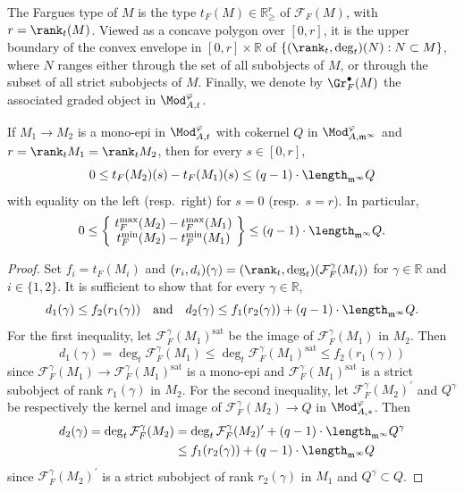 The Fargues type of $M$ is the type $t_{F}(M)\in\mathbb{R}_{\geq}^{r}$ of $\mathcal{F}_{F}(M)$, with $r=\rank_{t}(M)$. Viewed as a concave polygon over $[0,r]$, it is the upper boundary of the convex envelope in $[0,r]\times\mathbb{R}$ of $\{(\rank_{t},\deg_{t})(N):N\subset M\}$, where $N$ ranges either through the set of all subobjects of $M$, or through the subset of all strict subobjects of $M$. Finally, we denote by $\Gr_{F}^{\bullet}(M)$ the associated graded object in $\Mod_{A,t}^{\varphi}$.

\begin{prop}\label{prop:PseudoIsogInModt}
If $M_{1}\rightarrow M_{2}$ is a mono-epi in $\Mod_{A,t}^{\varphi}$ with cokernel $Q$ in $\Mod_{A,\mathfrak{m}^{\infty}}^{\varphi}$ and $r=\rank_{t}M_{1}=\rank_{t}M_{2}$, then for every $s\in[0,r]$,
\[
0\leq t_{F}(M_{2})(s)-t_{F}(M_{1})(s)\leq(q-1)\cdot\length_{\mathfrak{m}^{\infty}}Q
\]
with equality on the left (resp.~right) for $s=0$ (resp.~$s=r$). In particular,
\[
0\leq\left\{\!
\begin{array}{c}
t_{F}^{\max}(M_{2})-t_{F}^{\max}(M_{1})\\
t_{F}^{\min}(M_{2})-t_{F}^{\min}(M_{1})
\end{array}\!\right\} \leq(q-1)\cdot\length_{\mathfrak{m}^{\infty}}Q.
\]
\end{prop}

\begin{proof}
Set $f_{i}=t_{F}(M_{i})$ and $(r_{i},d_{i})(\gamma)=(\rank_{t},\deg_{t})(\mathcal{F}_{F}^{\gamma}(M_{i}))$ for $\gamma\in\mathbb{R}$ and $i\in\{1,2\}$. It is sufficient to show that for every $\gamma\in\mathbb{R}$,
\[
d_{1}(\gamma)\leq f_{2}(r_{1}(\gamma))\quad\text{and}\quad d_{2}(\gamma)\leq f_{1}(r_{2}(\gamma))+(q-1)\cdot\length_{\mathfrak{m}^{\infty}}Q.
\]
For the first inequality, let $\mathcal{F}_{F}^{\gamma}(M_{1})^{\mathrm{sat}}$ be the image of $\mathcal{F}_{F}^{\gamma}(M_{1})$ in $M_{2}$. Then
\[
d_{1}(\gamma)=\deg_{t}\mathcal{F}_{F}^{\gamma}(M_{1})\leq\deg_{t}\mathcal{F}_{F}^{\gamma}(M_{1})^{\mathrm{sat}}\leq f_{2}(r_{1}(\gamma))
\]
since $\mathcal{F}_{F}^{\gamma}(M_{1})\rightarrow\mathcal{F}_{F}^{\gamma}(M_{1})^{\mathrm{sat}}$ is a mono-epi and $\mathcal{F}_{F}^{\gamma}(M_{1})^{\mathrm{sat}}$ is a strict subobject of rank $r_{1}(\gamma)$ in $M_{2}$. For the second inequality, let $\mathcal{F}_{F}^{\gamma}(M_{2})^{\prime}$ and $Q^{\gamma}$ be respectively the kernel and image of $\mathcal{F}_{F}^{\gamma}(M_{2})\rightarrow Q$ in $\Mod_{A,\ast}^{\varphi}$. Then
\begin{align*}
d_{2}(\gamma)=\deg_{t}\mathcal{F}_{F}^{\gamma}(M_{2}) & = \deg_{t}\mathcal{F}_{F}^{\gamma}(M_{2})^{\prime}+(q-1)\cdot\length_{\mathfrak{m}^{\infty}}Q^{\gamma}\\
& \leq f_{1}(r_{2}(\gamma))+(q-1)\cdot\length_{\mathfrak{m}^{\infty}}Q
\end{align*}
since $\mathcal{F}_{F}^{\gamma}(M_{2})^{\prime}$ is a strict subobject of rank $r_{2}(\gamma)$ in $M_{1}$ and $Q^{\gamma}\subset Q$.
\end{proof}

